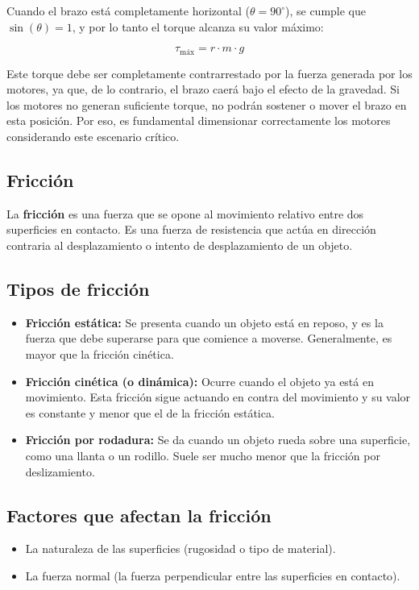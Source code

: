 Cuando el brazo está completamente horizontal ($\theta = 90^\circ$), se cumple que $\sin(\theta) = 1$, y por lo tanto el torque alcanza su valor máximo:

\begin{equation}
	\tau_{\text{máx}} = r \cdot m \cdot g
\end{equation}

Este torque debe ser completamente contrarrestado por la fuerza generada por los motores, ya que, de lo contrario, el brazo caerá bajo el efecto de la gravedad. Si los motores no generan suficiente torque, no podrán sostener o mover el brazo en esta posición. Por eso, es fundamental dimensionar correctamente los motores considerando este escenario crítico.


\subsection{Fricción}

La \textbf{fricción} es una fuerza que se opone al movimiento relativo entre dos superficies en contacto. Es una fuerza de resistencia que actúa en dirección contraria al desplazamiento o intento de desplazamiento de un objeto.

\subsection{Tipos de fricción}
\begin{itemize}
	\item \textbf{Fricción estática:} Se presenta cuando un objeto está en reposo, y es la fuerza que debe superarse para que comience a moverse. Generalmente, es mayor que la fricción cinética.
	
	\item \textbf{Fricción cinética (o dinámica):} Ocurre cuando el objeto ya está en movimiento. Esta fricción sigue actuando en contra del movimiento y su valor es constante y menor que el de la fricción estática.
	
	\item \textbf{Fricción por rodadura:} Se da cuando un objeto rueda sobre una superficie, como una llanta o un rodillo. Suele ser mucho menor que la fricción por deslizamiento.
\end{itemize}

\subsection{Factores que afectan la fricción}
\begin{itemize}
	\item La naturaleza de las superficies (rugosidad o tipo de material).
	\item La fuerza normal (la fuerza perpendicular entre las superficies en contacto).
\end{itemize}

